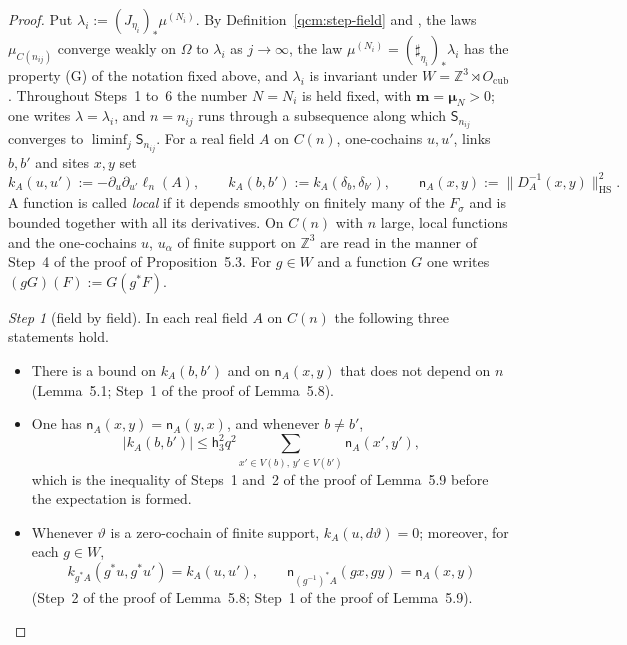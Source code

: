 \documentclass[11pt,letterpaper,reqno]{amsart}
\theoremstyle{definition}
\begin{document}
\begin{proof}
Put $\lambda_i:=(J_{\eta_i})_*\mu^{(N_i)}$.
By Definition~\ref{qcm:step-field} and \cite[Section~6.3]{QEDConstruction}, the laws $\mu_{C(n_{ij})}$ converge weakly on $\Omega$ to $\lambda_i$ as $j\to\infty$,
the law $\mu^{(N_i)}=(\sharp_{\eta_i})_*\lambda_i$ has the property (G) of the notation fixed above,
and $\lambda_i$ is invariant under $W=\mathbb Z^3\rtimes O_{\mathrm{cub}}$.
Throughout Steps~1 to~6 the number $N=N_i$ is held fixed, with $\mathbf m=\boldsymbol\mu_N>0$;
one writes $\lambda=\lambda_i$, and $n=n_{ij}$ runs through a subsequence along which $\mathsf S_{n_{ij}}$ converges to $\liminf_j\mathsf S_{n_{ij}}$.
For a real field $A$ on $C(n)$, one-cochains $u,u'$, links $b,b'$ and sites $x,y$ set
\begin{equation*}
k_A(u,u'):=-\partial_u\partial_{u'}\ell_n(A),\qquad k_A(b,b'):=k_A(\delta_b,\delta_{b'}),\qquad\mathsf n_A(x,y):=\|D_A^{-1}(x,y)\|^2_{\mathrm{HS}}.
\end{equation*}
A function is called \emph{local} if it depends smoothly on finitely many of the $F_\sigma$ and is bounded together with all its derivatives.
On $C(n)$ with $n$ large, local functions and the one-cochains $u$, $u_\alpha$ of finite support on $\mathbb Z^3$ are read in the manner of Step~4 of the proof of Proposition~5.3.
For $g\in W$ and a function $G$ one writes $(gG)(F):=G(g^*F)$.

\emph{Step 1} (field by field).
In each real field $A$ on $C(n)$ the following three statements hold.
\begin{itemize}
\item[(i)] There is a bound on $k_A(b,b')$ and on $\mathsf n_A(x,y)$ that does not depend on $n$ (Lemma~5.1; Step~1 of the proof of Lemma~5.8).
\item[(ii)] One has $\mathsf n_A(x,y)=\mathsf n_A(y,x)$, and whenever $b\ne b'$,
\begin{equation*}
|k_A(b,b')|\le\mathsf h_3^2q^2\sum_{x'\in V(b),\,y'\in V(b')}\mathsf n_A(x',y'),
\end{equation*}
which is the inequality of Steps~1 and~2 of the proof of Lemma~5.9 before the expectation is formed.
\item[(iii)] Whenever $\vartheta$ is a zero-cochain of finite support, $k_A(u,d\vartheta)=0$;
moreover, for each $g\in W$,
\begin{equation*}
k_{g^*A}(g^*u,g^*u')=k_A(u,u'),\qquad\mathsf n_{(g^{-1})^*A}(gx,gy)=\mathsf n_A(x,y)
\end{equation*}
(Step~2 of the proof of Lemma~5.8; Step~1 of the proof of Lemma~5.9).
\end{itemize}


\end{proof}
\end{document}
